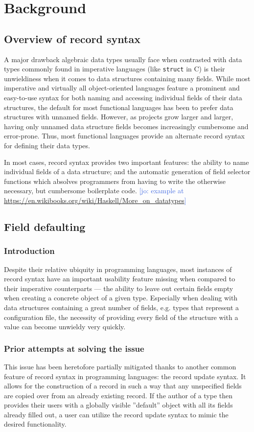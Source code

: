 \documentclass[en]{pracamgr}
\newcommand{\jcom}[1]{\textcolor{RoyalBlue}{[jo: #1]}}
\begin{document}
\chapter{Background}\label{r:bg}
\section{Overview of record syntax}
A major drawback algebraic data types usually face when contrasted with data types commonly found in imperative languages (like \texttt{struct} in C) is their unwieldiness when it comes to data structures containing many fields.
While most imperative and virtually all object-oriented languages feature a prominent and easy-to-use syntax for both naming and accessing individual fields of their data structures, the default for most functional languages has been to prefer data structures with unnamed fields.
However, as projects grow larger and larger, having only unnamed data structure fields becomes increasingly cumbersome and error-prone.
Thus, most functional languages provide an alternate record syntax for defining their data types. 

In most cases, record syntax provides two important features: 
the ability to name individual fields of a data structure; 
and the automatic generation of field selector functions which
absolves programmers from having to write the otherwise necessary,
but cumbersome boilerplate code. 
\jcom{example at \url{https://en.wikibooks.org/wiki/Haskell/More_on_datatypes}}
\section{Field defaulting}
\subsection{Introduction}
Despite their relative ubiquity in programming languages, most instances
of record syntax have an important usability feature missing when compared
to their imperative counterparts --- the ability to leave out certain fields empty
when creating a concrete object of a given type. Especially when dealing with
data structures containing a great number of fields, e.g. types that represent
a configuration file, the necessity of providing every field 
of the structure with a value can become unwieldy very quickly. 
\subsection{Prior attempts at solving the issue}
This issue has been heretofore partially mitigated thanks to another common feature of record syntax in programming languages: the record update syntax. 
It allows for the construction of a record in such a way that any unspecified fields are copied over from an already existing record. 
If the author of a type then provides their users with a globally visible ''default'' object with all its fields already filled out, a user can utilize the record update syntax to mimic the desired functionality.
\end{document}
